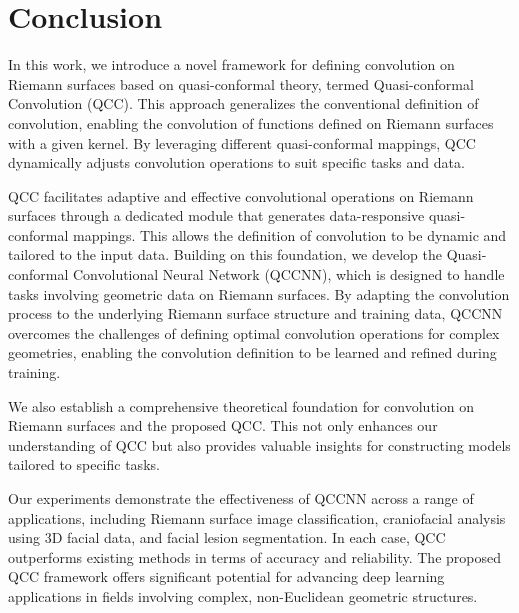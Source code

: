 \section{Conclusion}

In this work, we introduce a novel framework for defining convolution on Riemann surfaces based on quasi-conformal theory, termed Quasi-conformal Convolution (QCC). This approach generalizes the conventional definition of convolution, enabling the convolution of functions defined on Riemann surfaces with a given kernel. By leveraging different quasi-conformal mappings, QCC dynamically adjusts convolution operations to suit specific tasks and data.

QCC facilitates adaptive and effective convolutional operations on Riemann surfaces through a dedicated module that generates data-responsive quasi-conformal mappings. This allows the definition of convolution to be dynamic and tailored to the input data. Building on this foundation, we develop the Quasi-conformal Convolutional Neural Network (QCCNN), which is designed to handle tasks involving geometric data on Riemann surfaces. By adapting the convolution process to the underlying Riemann surface structure and training data, QCCNN overcomes the challenges of defining optimal convolution operations for complex geometries, enabling the convolution definition to be learned and refined during training.

We also establish a comprehensive theoretical foundation for convolution on Riemann surfaces and the proposed QCC. This not only enhances our understanding of QCC but also provides valuable insights for constructing models tailored to specific tasks.

Our experiments demonstrate the effectiveness of QCCNN across a range of applications, including Riemann surface image classification, craniofacial analysis using 3D facial data, and facial lesion segmentation. In each case, QCC outperforms existing methods in terms of accuracy and reliability. The proposed QCC framework offers significant potential for advancing deep learning applications in fields involving complex, non-Euclidean geometric structures.